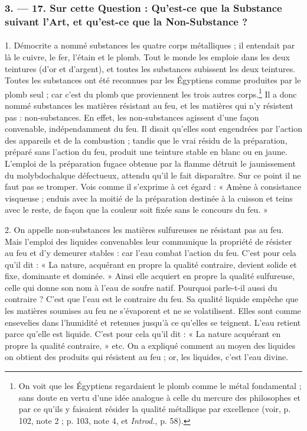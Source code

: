 \documentclass[landscape, a4paper, 11pt, oneside, polutonikogreek, french]{article}
\begin{document}
\bigskip
\centerline{\EightStarTaper}
\centerline{\EightStarTaper\EightStarTaper}
\bigskip

\subsubsection{3. --- 17. Sur cette Question : Qu'est-ce que la Substance suivant l'Art, et qu'est-ce que la Non-Substance ?}
\paragraph{}
1. Démocrite a nommé substances les quatre corps métalliques ; il entendait par là le cuivre, le fer, l'étain et le plomb. Tout le monde les emploie dans les deux teintures (d'or et d'argent), et toutes les substances subissent les deux teintures. Toutes les substances ont été reconnues par les Égyptiens comme produites par le plomb seul ; car c'est du plomb que proviennent les trois autres corps.\footnote{On voit que les Égyptiens regardaient le plomb comme le métal fondamental ; sans doute en vertu d'une idée analogue à celle du mercure des philosophes et par ce qu'ils y faisaient résider la qualité métallique par excellence (voir, p. 102, note 2 ; p. 103, note 4, et \emph{Introd.}, p. 58).} Il a donc nommé substances les matières résistant au feu, et les matières qui n'y résistent pas : non-substances. En effet, les non-substances agissent d'une façon convenable, indépendamment du feu. Il disait qu'elles sont engendrées par l'action des appareils et de la combustion ; tandis que le vrai résidu de la préparation, préparé sans l'action du feu, produit une teinture stable en blanc ou en jaune. L'emploi de la préparation fugace obtenue par la flamme détruit le jaunissement du molybdochalque défectueux, attendu qu'il le fait disparaître. Sur ce point il ne faut pas se tromper. Vois comme il s'exprime à cet égard : « Amène à consistance visqueuse ; enduis avec la moitié de la préparation destinée à la cuisson et teins avec le reste, de façon que la couleur soit fixée sans le concours du feu. »

2. On appelle non-substances les matières sulfureuses ne résistant pas au feu. Mais l'emploi des liquides convenables leur communique la propriété de résister au feu et d'y demeurer stables : car l'eau combat l'action du feu. C'est pour cela qu'il dit : « La nature, acquérant en propre la qualité contraire, devient solide et fixe, dominante et dominée. » Ainsi elle acquiert en propre la qualité sulfureuse, celle qui donne son nom à l'eau de soufre natif. Pourquoi parle-t-il aussi du contraire ? C'est que l'eau est le contraire du feu. Sa qualité liquide empêche que les matières soumises au feu ne s'évaporent et ne se volatilisent. Elles sont comme ensevelies dans l'humidité et retenues jusqu'à ce qu'elles se teignent. L'eau retient parce qu'elle est liquide. C'est pour cela qu'il dit : « La nature acquérant en propre la qualité contraire, » etc. On a expliqué comment au moyen des liquides on obtient des produits qui résistent au feu ; or, les liquides, c'est l'eau divine.
\end{document}
